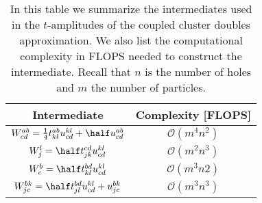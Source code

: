         \begin{table}
            \centering
            \caption{In this table we summarize the intermediates used in
            the $t$-amplitudes of the coupled cluster doubles approximation. We
            also list the computational complexity in FLOPS needed to construct
            the intermediate. Recall that $n$ is the number of holes and $m$ the
            number of particles.}
            \begin{tabular}{cc}
                Intermediate & Complexity [FLOPS] \\
                \midrule
                $W^{ab}_{cd}
                = \frac{1}{4} t^{ab}_{kl} u^{kl}_{cd}
                + \half u^{ab}_{cd}$
                &
                $\mathcal{O}(m^4 n^2)$ \\
                \addlinespace
                $W^{l}_{j}
                = \half t^{cd}_{jk} u^{kl}_{cd}$
                &
                $\mathcal{O}(m^2 n^3)$
                \\
                \addlinespace
                $W^{b}_{c}
                = \half t^{bd}_{kl} u^{kl}_{cd}$
                &
                $\mathcal{O}(m^3 n2)$
                \\
                \addlinespace
                $W^{bk}_{jc}
                = \half t^{bd}_{jl} u^{kl}_{cd}
                + u^{bk}_{jc}$
                &
                $\mathcal{O}(m^3n^3)$
            \end{tabular}
            \label{tab:intermediates_ccd}
        \end{table}

